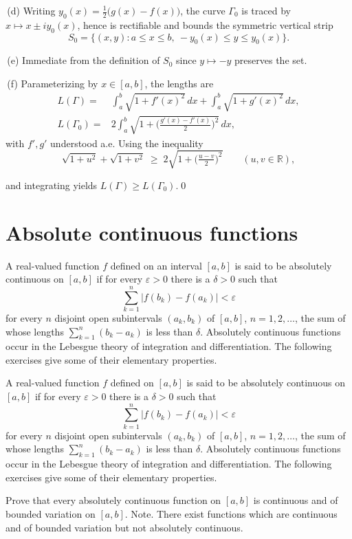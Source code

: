 \,(d) Writing $y_0(x)=\tfrac12\big(g(x)-f(x)\big)$, the curve $\Gamma_0$ is traced by $x\mapsto x\pm i y_0(x)$, hence is rectifiable and bounds the symmetric vertical strip
\[S_0=\{(x,y): a\le x\le b,\ -y_0(x)\le y\le y_0(x)\}.\]

\,(e) Immediate from the definition of $S_0$ since $y\mapsto -y$ preserves the set.

\,(f) Parameterizing by $x\in[a,b]$, the lengths are
\begin{align*}
L(\Gamma)=&\int_a^b\!\sqrt{1+f'(x)^2}\,dx+\int_a^b\!\sqrt{1+g'(x)^2}\,dx,\\
L(\Gamma_0)=&2\int_a^b\!\sqrt{1+\Big(\tfrac{g'(x)-f'(x)}{2}\Big)^{\!2}}\,dx,
\end{align*}
with $f',g'$ understood a.e. Using the inequality
\[\sqrt{1+u^2}+\sqrt{1+v^2}\;\ge\;2\sqrt{1+\Big(\tfrac{u-v}{2}\Big)^{\!2}}\qquad(u,v\in\mathbb{R}),\]

and integrating yields $L(\Gamma)\ge L(\Gamma_0)$.\qed
\section{Absolute continuous functions}
A real-valued function $f$ defined on an interval $[a,b]$ is said to be absolutely continuous on $[a,b]$ if for every $\varepsilon > 0$ there is a $\delta > 0$ such that
\[\sum_{k=1}^{n} |f(b_k) - f(a_k)| < \varepsilon\]
for every $n$ disjoint open subintervals $(a_k, b_k)$ of $[a, b]$, $n = 1, 2, \ldots$, the sum of whose lengths $\sum_{k=1}^{n} (b_k - a_k)$ is less than $\delta$.
Absolutely continuous functions occur in the Lebesgue theory of integration and differentiation. The following exercises give some of their elementary properties.



\begin{problembox}
A real-valued function $f$ defined on $[a, b]$ is said to be absolutely continuous on $[a, b]$ if for every $\varepsilon > 0$ there is a $\delta > 0$ such that
\[\sum_{k=1}^{n} |f(b_k) - f(a_k)| < \varepsilon\]
for every $n$ disjoint open subintervals $(a_k, b_k)$ of $[a, b]$, $n = 1, 2, \ldots$, the sum of whose lengths $\sum_{k=1}^{n} (b_k - a_k)$ is less than $\delta$. Absolutely continuous functions occur in the Lebesgue theory of integration and differentiation. The following exercises give some of their elementary properties.

Prove that every absolutely continuous function on $[a, b]$ is continuous and of bounded variation on $[a, b]$. Note. There exist functions which are continuous and of bounded variation but not absolutely continuous.
\end{problembox}

